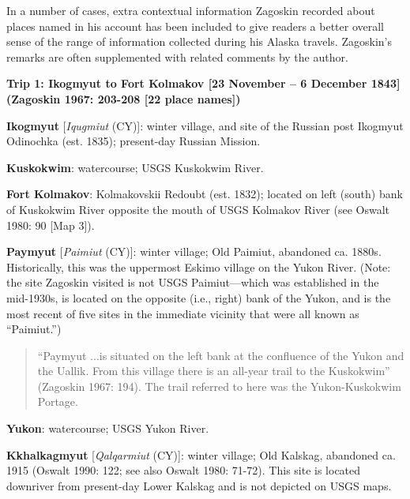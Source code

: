 In a number of cases, extra contextual information Zagoskin recorded about places named in his account has been included to give readers a better overall sense of the range of information collected during his Alaska travels. Zagoskin's remarks are often supplemented with related comments by the author.


\vspace{1cm}
\noindent
\textbf{Trip 1: Ikogmyut to Fort Kolmakov [23 November – 6 December 1843]
(Zagoskin 1967: 203-208 [22 place names])}
\vspace{6pt}

\begin{hang}

\textbf{Ikogmyut} [\textit{Iqugmiut} (CY)]: winter village, and site of the Russian post Ikogmyut Odinochka (est. 1835); present-day Russian Mission.



\textbf{Kuskokwim}: watercourse; USGS Kuskokwim River.



\textbf{Fort Kolmakov}: Kolmakovskii Redoubt (est. 1832); located on left (south) bank of Kuskokwim River opposite the mouth of USGS Kolmakov River (see Oswalt 1980: 90 [Map 3]).



\textbf{Paymyut} [\textit{Paimiut} (CY)]: winter village; Old Paimiut, abandoned ca. 1880s. Historically, this was the uppermost Eskimo village on the Yukon River. (Note: the site Zagoskin visited is not USGS Paimiut—which was established in the mid-1930s, is located on the opposite (i.e., right) bank of the Yukon, and is the most recent of five sites in the immediate vicinity that were all known as “Paimiut.”)



\begin{quote}“Paymyut ...is situated on the left bank at the confluence of the Yukon and the Uallik. From this village there is an all-year trail to the Kuskokwim” (Zagoskin 1967: 194). The trail referred to here was the Yukon-Kuskokwim Portage.
\end{quote}



\textbf{Yukon}: watercourse; USGS Yukon River.



\textbf{Kkhalkagmyut} [\textit{Qalqarmiut} (CY)]: winter village; Old Kalskag, abandoned ca. 1915 (Oswalt 1990: 122; see also Oswalt 1980: 71-72). This site is located downriver from present-day Lower Kalskag and is not depicted on USGS maps.




\end{hang}
